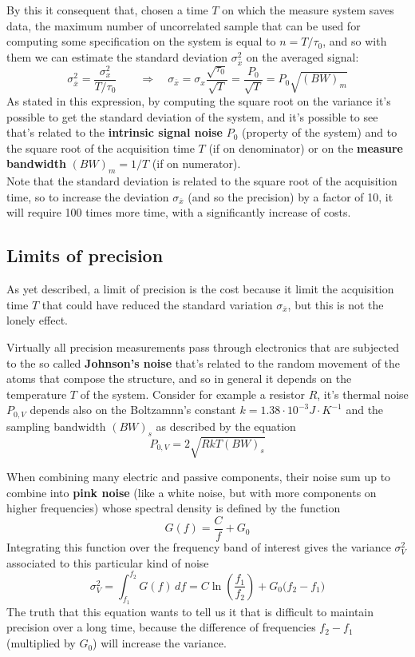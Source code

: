 		By this it consequent that, chosen a time $T$ on which the measure system saves data, the maximum number of uncorrelated sample that can be used for computing some specification on the system is equal to $n = T/\tau_0$, and so with them we can estimate the standard deviation $\sigma^2_{\overline x}$ on the averaged signal:
		\[ \sigma_{\overline x}^2 = \frac{\sigma_x^2}{T/\tau_0} \qquad \Rightarrow \quad \sigma_{\overline x} =\sigma_x \frac{\sqrt{\tau_0}}{\sqrt {T}} = \frac{P_0}{\sqrt {T}} = P_0 \sqrt{(BW)_m} \]
		As stated in this expression, by computing the square root on the variance it's possible to get the standard deviation of the system, and it's possible to see that's related to the \textbf{intrinsic signal noise} $P_0$ (property of the system) and to the square root of the acquisition time $T$ (if on denominator) or on the \textbf{measure bandwidth} $(BW)_m = 1/T$ (if on numerator). \\
		Note that the standard deviation is related to the square root of the acquisition time, so to increase the deviation $\sigma_{\overline x}$ (and so the precision) by a factor of 10, it will require 100 times more time, with a significantly increase of costs.
		
	\subsection{Limits of precision}
		
		As yet described, a limit of precision is the cost because it limit the acquisition time $T$ that could have reduced the standard variation $\sigma_{\overline x}$, but this is not the lonely effect.
		
		Virtually all precision measurements pass through electronics that are subjected to the so called \textbf{Johnson's noise} that's related to the random movement of the atoms that compose the structure, and so in general it depends on the temperature $T$ of the system. Consider for example a resistor $R$, it's thermal noise $P_{0,V}$ depends also on the Boltzamnn's constant $k = 1.38\cdot 10^{-3} J \cdot K^{-1}$ and the sampling bandwidth $(BW)_s$ as described by the equation
		\begin{equation}
			P_{0,V} = 2 \sqrt{RkT (BW)_s}
		\end{equation}
		
		When combining many electric and passive components, their noise sum up to combine into \textbf{pink noise} (like a white noise, but with more components on higher frequencies) whose spectral density is defined by the function
		\[ G(f) = \frac C f + G_0 \]
		Integrating this function over the frequency band of interest gives the variance $\sigma^2_V$ associated to this particular kind of noise
		\begin{equation}
			\sigma_V^2 = \int_{f_1}^ {f_2} G(f)\, df = C \ln \left( \frac{f_1}{f_2} \right) + G_0 \big(f_2-f_1\big)
		\end{equation}
		The truth that this equation wants to tell us it that is difficult to maintain precision over a long time, because the difference of frequencies $f_2-f_1$ (multiplied by $G_0$) will increase the variance.
		
